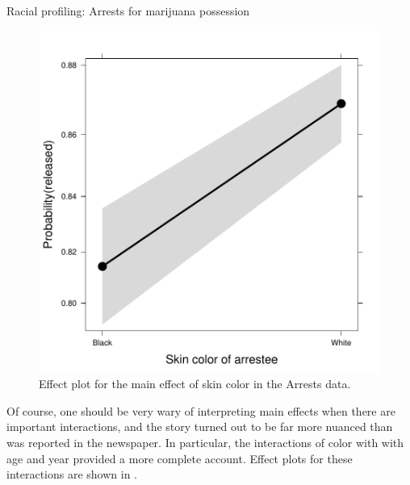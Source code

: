 \documentclass[11pt]{book}
\renewenvironment{knitrout}{\small\renewcommand{\baselinestretch}{.85}}{} %
\begin{document}
\begin{Example}[arrests]{Racial profiling: Arrests for marijuana possession}
\begin{knitrout}
\begin{figure}[!htbp]
\centerline{\includegraphics[width=.6\textwidth]{ch07/fig/arrests-eff1} }

\caption[Effect plot for the main effect of skin color in the Arrests data]{Effect plot for the main effect of skin color in the Arrests data.\label{fig:arrests-eff1}}
\end{figure}


\end{knitrout}

Of course, one should be very wary of interpreting main effects when there are
important interactions, and the story turned out to be far more nuanced than
was reported in the newspaper.  In particular, the interactions of color with
with age and year provided a more complete account.  Effect plots for these
interactions are shown in .  


\end{Example}
\end{document}
